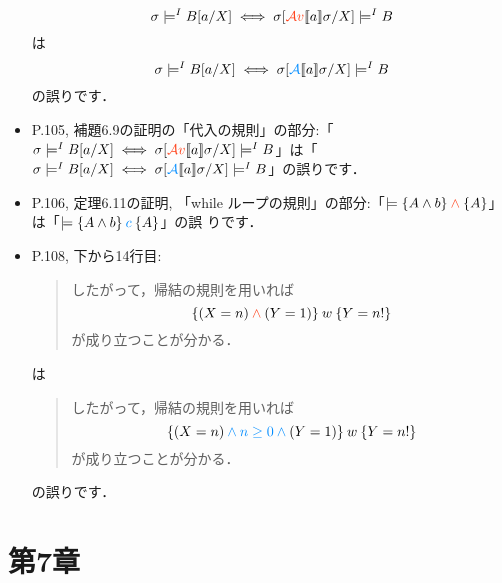 \documentclass[12pt,titlepage,twoside,openright,dvipdfmx]{jsbook}
\newcommand\old[1]{%
  \textcolor[rgb]{1.0,0.25,0.1}{#1}%
  }
\newcommand\new[1]{%
  \textcolor[rgb]{0,0.55,1.0}{#1}%
  }
\theoremstyle{definition}
\begin{document}
\begin{itemize}
  \[
    \sigma \models^I B[a/X] \iff \sigma[\old{\DAexpv}\sem{a}\sigma/X] \models^I B
  \]
  は
  \[
    \sigma \models^I B[a/X] \iff \sigma[\new{\DAexp}\sem{a}\sigma/X] \models^I B
  \]
  の誤りです．
\item P.105,
  補題6.9の証明の「代入の規則」の部分:「$\sigma \models^I B[a/X] \iff
  \sigma[\old{\DAexpv}\sem{a}\sigma/X] \models^I
  B$」は「$\sigma \models^I B[a/X] \iff \sigma[\new{\DAexp}\sem{a}\sigma/X]
  \models^I B$」の誤りです．
\item P.106, 定理6.11の証明, 「while
  ループの規則」の部分:「$\models \preCond{A \land b} \old{\land}
  \postCond{A}$」は「$\models \preCond{A \land b} \new{c} \postCond{A}$」の誤
  りです．
\item P.108, 下から14行目:
  \begin{quote}
    したがって，帰結の規則を用いれば
    \[
      \preCond{(X = n) \old{{}\land{}} (Y=1)} w \postCond{Y = n!}
    \]
    が成り立つことが分かる．
  \end{quote}
  は
  \begin{quote}
    したがって，帰結の規則を用いれば
    \[
      \preCond{(X = n) \new{{}\land n \ge 0 \land{}} (Y=1)} w \postCond{Y = n!}
    \]
    が成り立つことが分かる．
  \end{quote}
  の誤りです．
\end{itemize}
\fi
\fi

\section*{第7章}
\end{document}
